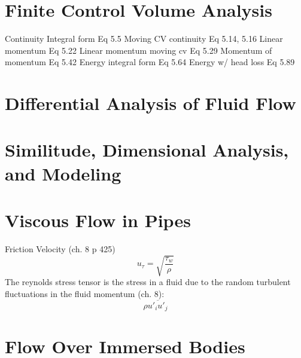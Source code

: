\documentclass{article}
\begin{document}
\section{Finite Control Volume Analysis}

Continuity Integral form Eq 5.5
Moving CV continuity Eq 5.14, 5.16
Linear momentum Eq 5.22
Linear momentum moving cv Eq 5.29
Momentum of momentum Eq 5.42
Energy integral form Eq 5.64
Energy w/ head loss Eq 5.89


%
%
\newpage
\section{Differential Analysis of Fluid Flow}



%
%
\newpage
\section{Similitude, Dimensional Analysis, and Modeling}



%
%
\newpage
\section{Viscous Flow in Pipes}

Friction Velocity (ch. 8 p 425)
\begin{equation}
  u_\tau = \sqrt{\frac{\tau_w}{\rho}}
\end{equation}
\newline
\newline
The reynolds stress tensor is the stress in a fluid due to the random turbulent fluctuations in the fluid momentum (ch. 8):
\begin{equation}
  \rho \overline{u'_i u'_j}
\end{equation}


%
%
\newpage
\section{Flow Over Immersed Bodies}
\end{document}
